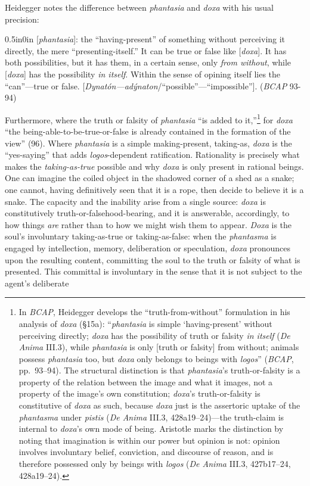Heidegger notes the difference between \textit{phantasia} and \textit{doxa} with his usual precision: 
\begin{adjustwidth}{0.5in}{0in}
     [\textit{phantasia}]: the ``having-present'' of something without perceiving it directly, the mere ``presenting-itself.'' It can be true or false like  [\textit{doxa}]. It has both possibilities, but it has them, in a certain sense, only \textit{from without}, while  [\textit{doxa}] has the possibility \textit{in itself}. Within the sense of opining itself lies the ``can''---true or false.  [\textit{Dynatón---adýnaton}/``possible''---``impossible'']. (\textit{BCAP} 93-94)
\end{adjustwidth}
Furthermore, where the truth or falsity of \textit{phantasia} ``is added to it,''\footnote{In \textit{BCAP}, Heidegger develops the ``truth-from-without'' formulation in his analysis of \textit{doxa} (§15a): ``\textit{phantasia} is simple `having-present' without perceiving directly; \textit{doxa} has the possibility of truth or falsity \textit{in itself} (\textit{De Anima} III.3), while \textit{phantasia} is only [truth or falsity] from without; animals possess \textit{phantasia} too, but \textit{doxa} only belongs to beings with \textit{logos}'' (\textit{BCAP}, pp.~93--94). The structural distinction is that \textit{phantasia}'s truth-or-falsity is a property of the relation between the image and what it images, not a property of the image's own constitution; \textit{doxa}'s truth-or-falsity is constitutive of \textit{doxa} as such, because \textit{doxa} just is the assertoric uptake of the \textit{phantasma} under \textit{pistis} (\textit{De Anima} III.3, 428a19--24)---the truth-claim is internal to \textit{doxa}'s own mode of being. Aristotle marks the distinction by noting that imagination is within our power but opinion is not: opinion involves involuntary belief, conviction, and discourse of reason, and is therefore possessed only by beings with \textit{logos} (\textit{De Anima} III.3, 427b17--24, 428a19--24).} for \textit{doxa} ``the being-able-to-be-true-or-false is already contained in the formation of the view'' (96). Where \textit{phantasia} is a simple making-present, taking-as, \textit{doxa} is the ``yes-saying'' that adds \textit{logos}-dependent ratification. Rationality is precisely what makes the \textit{taking-as-true} possible and why \textit{doxa} is only present in rational beings. One can imagine the coiled object in the shadowed corner of a shed as a snake; one cannot, having definitively seen that it is a rope, then decide to believe it is a snake. The capacity and the inability arise from a single source: \textit{doxa} is constitutively truth-or-falsehood-bearing, and it is answerable, accordingly, to how things \textit{are} rather than to how we might wish them to appear. \textit{Doxa} is the soul's involuntary taking-as-true or taking-as-false: when the \textit{phantasma} is engaged by intellection, memory, deliberation or speculation, \textit{doxa} pronounces upon the resulting content, committing the soul to the truth or falsity of what is presented. This committal is involuntary in the sense that it is not subject to the agent's deliberate 